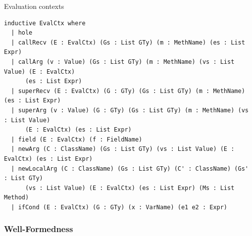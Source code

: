 \begin{cmp}{Evaluation contexts}
\begin{paperside}
\end{paperside}
\begin{leanside}
\begin{lstlisting}[style=leanside]
inductive EvalCtx where
  | hole
  | callRecv (E : EvalCtx) (Gs : List GTy) (m : MethName) (es : List Expr)
  | callArg (v : Value) (Gs : List GTy) (m : MethName) (vs : List Value) (E : EvalCtx)
      (es : List Expr)
  | superRecv (E : EvalCtx) (G : GTy) (Gs : List GTy) (m : MethName) (es : List Expr)
  | superArg (v : Value) (G : GTy) (Gs : List GTy) (m : MethName) (vs : List Value)
      (E : EvalCtx) (es : List Expr)
  | field (E : EvalCtx) (f : FieldName)
  | newArg (C : ClassName) (Gs : List GTy) (vs : List Value) (E : EvalCtx) (es : List Expr)
  | newLocalArg (C : ClassName) (Gs : List GTy) (C' : ClassName) (Gs' : List GTy)
      (vs : List Value) (E : EvalCtx) (es : List Expr) (Ms : List Method)
  | ifCond (E : EvalCtx) (G : GTy) (x : VarName) (e1 e2 : Expr)
\end{lstlisting}
\end{leanside}
\end{cmp}

\subsubsection{Well-Formedness}

